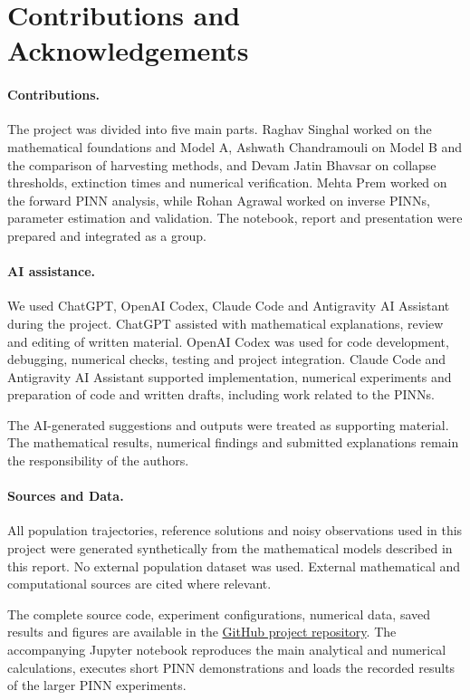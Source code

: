 
\section{Contributions and Acknowledgements}
\label{sec:acknowledgements}

\paragraph{Contributions.}
The project was divided into five main parts.
Raghav Singhal worked on the mathematical foundations and
Model A, Ashwath Chandramouli on Model B and the comparison
of harvesting methods, and Devam Jatin Bhavsar on collapse
thresholds, extinction times and numerical verification.
Mehta Prem worked on the forward PINN analysis, while
Rohan Agrawal worked on inverse PINNs, parameter estimation
and validation. The notebook, report and presentation
were prepared and integrated as a group.

\paragraph{AI assistance.}
We used ChatGPT, OpenAI Codex, Claude Code and
Antigravity AI Assistant during the project.
ChatGPT assisted with mathematical explanations,
review and editing of written material.
OpenAI Codex was used for code development, debugging,
numerical checks, testing and project integration.
Claude Code and Antigravity AI Assistant supported
implementation, numerical experiments and preparation
of code and written drafts, including work related
to the PINNs.

The AI-generated suggestions and outputs were treated
as supporting material. The mathematical results,
numerical findings and submitted explanations remain
the responsibility of the authors.

\paragraph{Sources and Data.}
All population trajectories, reference solutions and
noisy observations used in this project were generated
synthetically from the mathematical models described
in this report. No external population dataset was
used. External mathematical and computational sources
are cited where relevant.

The complete source code, experiment configurations,
numerical data, saved results and figures are available
in the \href{https://github.com/devam2006/mm-allee-harvesting}
{GitHub project repository}.
The accompanying Jupyter notebook reproduces the
main analytical and numerical calculations, executes
short PINN demonstrations and loads the recorded
results of the larger PINN experiments.
